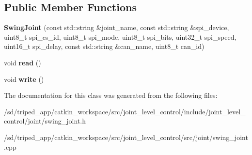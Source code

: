 \subsection*{Public Member Functions}
\begin{DoxyCompactItemize}
\item 
\mbox{\label{classSwingJoint_a283b5b0bbd8994f055995e643291b561}} 
{\bfseries Swing\+Joint} (const std\+::string \&joint\+\_\+name, const std\+::string \&spi\+\_\+device, uint8\+\_\+t spi\+\_\+cs\+\_\+id, uint8\+\_\+t spi\+\_\+mode, uint8\+\_\+t spi\+\_\+bits, uint32\+\_\+t spi\+\_\+speed, uint16\+\_\+t spi\+\_\+delay, const std\+::string \&can\+\_\+name, uint8\+\_\+t can\+\_\+id)
\item 
\mbox{\label{classSwingJoint_a3f966fc71b37d8e5c34e2ddc5ec79e03}} 
void {\bfseries read} ()
\item 
\mbox{\label{classSwingJoint_aa2d54c4712616e04e36af2db528384ab}} 
void {\bfseries write} ()
\end{DoxyCompactItemize}


The documentation for this class was generated from the following files\+:\begin{DoxyCompactItemize}
\item 
/sd/triped\+\_\+app/catkin\+\_\+workspace/src/joint\+\_\+level\+\_\+control/include/joint\+\_\+level\+\_\+control/joint/swing\+\_\+joint.\+h\item 
/sd/triped\+\_\+app/catkin\+\_\+workspace/src/joint\+\_\+level\+\_\+control/src/joint/swing\+\_\+joint.\+cpp\end{DoxyCompactItemize}
